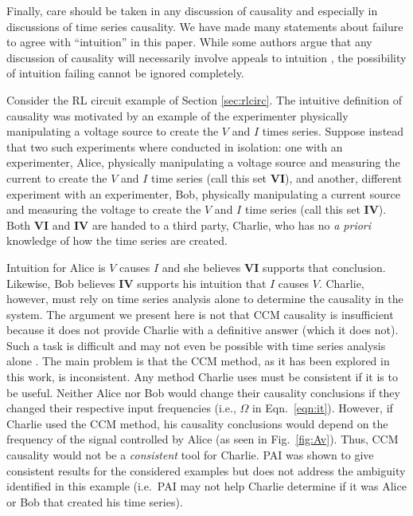 \documentclass[twocolumn,aps,pre,groupedaddress]{revtex4-1}
\begin{document}
Finally, care should be taken in any discussion of causality and especially in discussions of time series causality.  We have made many statements about failure to agree with ``intuition'' in this paper.  While some authors argue that any discussion of causality will necessarily involve appeals to intuition \cite{Pearl2000}, the possibility of intuition failing cannot be ignored completely.  

Consider the RL circuit example of Section \ref{sec:rlcirc}.  The intuitive definition of causality was motivated by an example of the experimenter physically manipulating a voltage source to create the $V$ and $I$ times series.  Suppose instead that two such experiments where conducted in isolation: one with an experimenter, Alice, physically manipulating a voltage source and measuring the current to create the $V$ and $I$ time series (call this set $\mathbf{VI}$), and another, different experiment with an experimenter, Bob, physically manipulating a current source and measuring the voltage to create the $V$ and $I$ time series (call this set $\mathbf{IV}$).  Both $\mathbf{VI}$ and $\mathbf{IV}$ are handed to a third party, Charlie, who has no {\em a priori} knowledge of how the time series are created.

Intuition for Alice is $V$ causes $I$ and she believes $\mathbf{VI}$ supports that conclusion.  Likewise, Bob believes $\mathbf{IV}$ supports his intuition that $I$ causes $V$.  Charlie, however, must rely on time series analysis alone to determine the causality in the system.  The argument we present here is not that CCM causality is insufficient because it does not provide Charlie with a definitive answer (which it does not).  Such a task is difficult and may not even be possible with time series analysis alone \cite{Pearl2000}.  The main problem is that the CCM method, as it has been explored in this work, is inconsistent.  Any method Charlie uses must be consistent if it is to be useful.  Neither Alice nor Bob would change their causality conclusions if they changed their respective input frequencies (i.e., $\Omega$ in Eqn.\ \ref{eqn:it}).  However, if Charlie used the CCM method, his causality conclusions would depend on the frequency of the signal controlled by Alice (as seen in Fig.\ \ref{fig:Av}).  Thus, CCM causality would not be a {\em consistent} tool for Charlie.  PAI was shown to give consistent results for the considered examples but does not address the ambiguity identified in this example (i.e.\ PAI may not help Charlie determine if it was Alice or Bob that created his time series).

%

\end{document}
